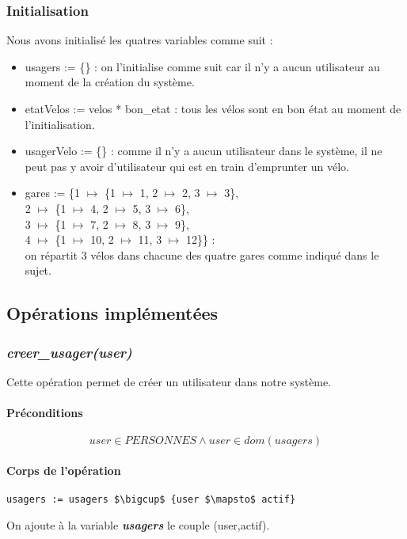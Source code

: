 \documentclass[12pt]{article}
\begin{document}
\subsubsection{Initialisation}
Nous avons initialisé les quatres variables comme suit :
\begin{itemize}
  \item usagers := \{\} : on l'initialise comme suit car il n'y a aucun utilisateur au moment de la création du système.
  \item etatVelos := velos * {bon\_etat} : tous les vélos sont en bon état au moment de l'initialisation.
  \item usagerVelo := \{\} : comme il n'y a aucun utilisateur dans le système, il ne peut pas y avoir d'utilisateur qui est en train d'emprunter un vélo.
  \item gares := \{1 $\mapsto$ \{1 $\mapsto$ 1, 2 $\mapsto$ 2, 3 $\mapsto$ 3\},\\ 2 $\mapsto$ \{1 $\mapsto$ 4, 2 $\mapsto$ 5, 3 $\mapsto$ 6\},\\ 3 $\mapsto$ \{1 $\mapsto$ 7, 2 $\mapsto$ 8, 3 $\mapsto$ 9\},\\ 4 $\mapsto$ \{1 $\mapsto$ 10, 2 $\mapsto$ 11, 3 $\mapsto$ 12\}\} :\\ on répartit 3 vélos dans chacune des quatre gares comme indiqué dans le sujet.
\end{itemize}
\subsection{Opérations implémentées}
\subsubsection{\textit{creer\_usager(user)}}
Cette opération permet de créer un utilisateur dans notre système.
\paragraph{Préconditions}
\[user \in PERSONNES \land user \in dom(usagers)\]
\paragraph{Corps de l'opération}
\textbf{}
\begin{lstlisting}[mathescape]
  usagers := usagers $\bigcup$ {user $\mapsto$ actif}
\end{lstlisting}

On ajoute à la variable \textit{\textbf{usagers}} le couple (user,actif).
\end{document}
